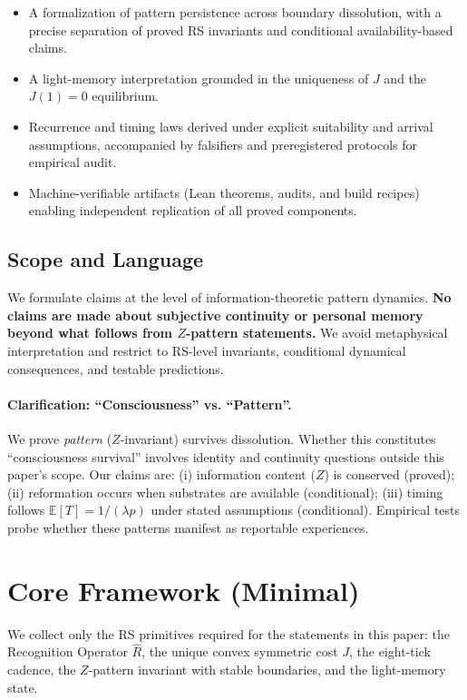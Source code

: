 \documentclass[11pt,letterpaper]{article}
\theoremstyle{definition}
\theoremstyle{remark}
\begin{document}
\begin{itemize}
  \item A formalization of pattern persistence across boundary dissolution, with a precise separation of proved RS invariants and conditional availability-based claims.
  \item A light-memory interpretation grounded in the uniqueness of \(J\) and the \(J(1)=0\) equilibrium.
  \item Recurrence and timing laws derived under explicit suitability and arrival assumptions, accompanied by falsifiers and preregistered protocols for empirical audit.
  \item Machine-verifiable artifacts (Lean theorems, audits, and build recipes) enabling independent replication of all proved components.
\end{itemize}

\subsection{Scope and Language}

We formulate claims at the level of information-theoretic pattern dynamics. \textbf{No claims are made about subjective continuity or personal memory beyond what follows from \(Z\)-pattern statements.} We avoid metaphysical interpretation and restrict to RS-level invariants, conditional dynamical consequences, and testable predictions.

\paragraph{Clarification: ``Consciousness'' vs. ``Pattern''.}
We prove \emph{pattern} (\(Z\)-invariant) survives dissolution. Whether this constitutes ``consciousness survival'' involves identity and continuity questions outside this paper's scope. Our claims are: (i) information content (\(Z\)) is conserved (proved); (ii) reformation occurs when substrates are available (conditional); (iii) timing follows \(\mathbb{E}[T]=1/(\lambda p)\) under stated assumptions (conditional). Empirical tests probe whether these patterns manifest as reportable experiences.

\section{Core Framework (Minimal)}

We collect only the RS primitives required for the statements in this paper: the Recognition Operator \(\widehat{R}\), the unique convex symmetric cost \(J\), the eight-tick cadence, the \(Z\)-pattern invariant with stable boundaries, and the light-memory state.
\end{document}
